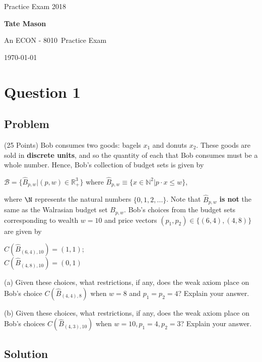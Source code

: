 \documentclass[10pt, a4paper]{article}
\newcommand\course{ECON - 8010}                            %
\newcommand\hwnumber{ 2018}                                 %
\newcommand\Information{Tate Mason}                        %
\newcommand{\R}{\mathbb R}
\newcommand{\NN}{\mathbb N}
\begin{document}
  \begin{titlepage}
    \begin{center}
      \vspace*{3cm}
            
        \vspace{1cm}
        \huge
        Practice Exam \hwnumber
            
        \vspace{1.5cm}
        \Large
            
        \textbf{\Information}                      %
            
        \vfill
        
        An \course \ Practice Exam
            
        \vspace{1cm}
        \Large

        
        \today
            
    \end{center}
  \end{titlepage}

  \newpage

  \section*{Question 1}
    \subsection*{Problem}
      (25 Points) Bob consumes two goods: bagels $x_1$ and donuts $x_2$. These goods are sold in \textbf{discrete units}, and so the quantity of each that Bob consumes must be a whole number. Hence, Bob's collection of budget sets is given by
      \begin{center}
        $\mathcal{B}=\{\hat B_{p,w}|(p,w)\in \R^3_{+}\}$ where $\hat B_{p,w}\equiv\{x\in\NN^2|p\cdot x\leq w\}$,
      \end{center}
      where $\N$ represents the natural numbers $\{0,1,2,...\}$. Note that $\hat B_{p,w}$ \textbf{is not} the same as the Walrasian budget set $B_{p,w}$.
      Bob's choices from the budget sets corresponding to wealth $w=10$ and price vectors $(p_1,p_2)\in\{(6,4),(4,8)\}$ are given by
      \begin{center}
        $C(\hat B_{(6,4),10})=(1,1)$; \\
        $C(\hat B_{(4,8),10})=(0,1)$
      \end{center}

      (a) Given these choices, what restrictions, if any, does the weak axiom place on Bob's choice $C(\hat B_{(4,4),8})$ when $w=8$ and $p_1=p_2=4$? Explain your answer.

      (b) Given these choices, what restrictions, if any, does the weak axiom place on Bob's choices $C(\hat B_{(4,3),10})$ when $w=10,p_1=4, p_2=3$? Explain your answer.
    \subsection*{Solution}
      
\end{document}
